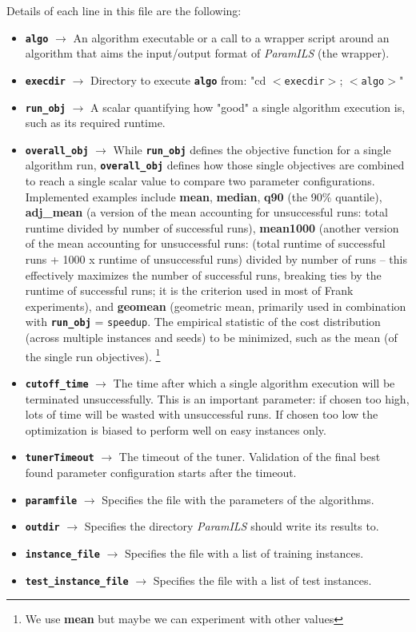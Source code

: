Details of each line in this file are the following:

\begin{itemize}
	\item \textbf{\texttt{algo}} $\rightarrow$ An algorithm executable or a call to a wrapper script around an algorithm that aims the input/output format of \textit{ParamILS} (the wrapper).
	\item \textbf{\texttt{execdir}} $\rightarrow$ Directory to execute \textbf{\texttt{algo}} from: "cd $<$\texttt{execdir}$>$; $<$\texttt{algo}$>$" 
	\item \textbf{\texttt{run\_obj}} $\rightarrow$ A scalar quantifying how "good" a single algorithm execution is, such as its required runtime.
	\item \textbf{\texttt{overall\_obj}} $\rightarrow$ While \textbf{\texttt{run\_obj}} defines the objective function for a single algorithm run, \textbf{\texttt{overall\_obj}} defines how those single objectives are combined to reach a single scalar value to compare two parameter configurations. Implemented examples include {\bf mean}, {\bf median}, {\bf q90} (the 90\% quantile), {\bf adj\_mean} (a version of the mean accounting for unsuccessful runs: total runtime divided by number of successful runs), {\bf mean1000} (another version of the mean accounting for unsuccessful runs: (total runtime of successful runs + 1000 x runtime of unsuccessful runs) divided by number of runs -- this effectively maximizes the number of successful runs, breaking ties by the runtime of successful runs; it is the criterion used in most of Frank experiments), and {\bf geomean} (geometric mean, primarily used in combination with \textbf{\texttt{run\_obj}} = \texttt{speedup}. The empirical statistic of the cost distribution (across multiple instances and seeds) to be minimized, such as the mean (of the single run objectives). \footnote{We use {\bf mean} but maybe we can experiment with other values}
	\item \textbf{\texttt{cutoff\_time}} $\rightarrow$ The time after which a single algorithm execution will be terminated unsuccessfully. This is an important parameter: if chosen too high, lots of time will be wasted with unsuccessful runs. If chosen too low the optimization is biased to perform well on easy instances only.
	\item \textbf{\texttt{tunerTimeout}} $\rightarrow$ The timeout of the tuner. Validation of the final best found parameter configuration starts after the timeout.
	\item \textbf{\texttt{paramfile}} $\rightarrow$ Specifies the file with the parameters of the algorithms. 
	\item \textbf{\texttt{outdir}} $\rightarrow$ Specifies the directory \textit{ParamILS} should write its results to.
	\item \textbf{\texttt{instance\_file}} $\rightarrow$ Specifies the file with a list of training instances. 
	\item \textbf{\texttt{test\_instance\_file}} $\rightarrow$ Specifies the file with a list of test instances.
\end{itemize}


